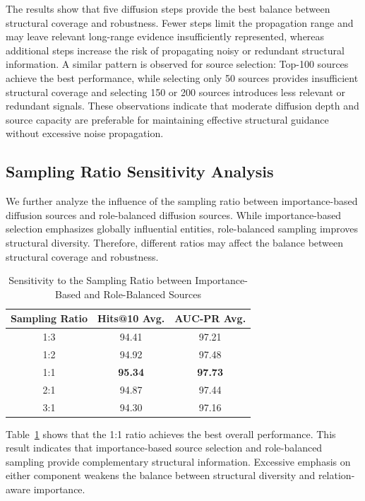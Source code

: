 \documentclass[preprint,12pt]{elsarticle}
\begin{document}
The results show that five diffusion steps provide the best balance between structural coverage and robustness. Fewer steps limit the propagation range and may leave relevant long-range evidence insufficiently represented, whereas additional steps increase the risk of propagating noisy or redundant structural information. A similar pattern is observed for source selection: Top-100 sources achieve the best performance, while selecting only 50 sources provides insufficient structural coverage and selecting 150 or 200 sources introduces less relevant or redundant signals. These observations indicate that moderate diffusion depth and source capacity are preferable for maintaining effective structural guidance without excessive noise propagation.

\subsection{Sampling Ratio Sensitivity Analysis}

We further analyze the influence of the sampling ratio between importance-based diffusion sources and role-balanced diffusion sources. While importance-based selection emphasizes globally influential entities, role-balanced sampling improves structural diversity. Therefore, different ratios may affect the balance between structural coverage and robustness.

\begin{table}[H]
\centering
\small
\caption{Sensitivity to the Sampling Ratio between Importance-Based and Role-Balanced Sources}
\label{tab:sampling-ratio-sensitivity}
\begin{tabular}{c|cc}
\hline
Sampling Ratio & Hits@10 Avg. & AUC-PR Avg. \\
\hline
1:3 & 94.41 & 97.21 \\
1:2 & 94.92 & 97.48 \\
1:1 & \textbf{95.34} & \textbf{97.73} \\
2:1 & 94.87 & 97.44 \\
3:1 & 94.30 & 97.16 \\
\hline
\end{tabular}
\end{table}

Table~\ref{tab:sampling-ratio-sensitivity} shows that the 1:1 ratio achieves the best overall performance. This result indicates that importance-based source selection and role-balanced sampling provide complementary structural information. Excessive emphasis on either component weakens the balance between structural diversity and relation-aware importance.
\end{document}
